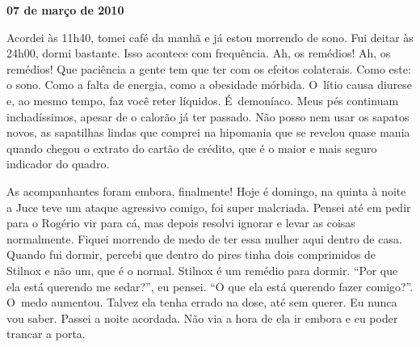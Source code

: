 \begin{center}\textbf{\asterisc{}}\end{center}


\begin{flushright}\textbf{07 de março de 2010}\end{flushright}


Acordei às 11h40, tomei café da manhã e já estou morrendo de sono. Fui
deitar às 24h00, dormi bastante. Isso acontece com frequência. Ah, os
remédios! Ah, os remédios! Que paciência a gente tem que ter com os
efeitos colaterais. Como este: o sono. Como a falta de energia, como a
obesidade mórbida. O~lítio causa diurese e, ao mesmo tempo, faz você
reter líquidos. É~demoníaco. Meus pés continuam inchadíssimos, apesar de
o calorão já ter passado. Não posso nem usar os sapatos novos, as
sapatilhas lindas que comprei na hipomania que se revelou quase mania
quando chegou o extrato do cartão de crédito, que é o maior e mais
seguro indicador do quadro.

As acompanhantes foram embora, finalmente! Hoje é domingo, na quinta à
noite a Juce teve um ataque agressivo comigo, foi super malcriada.
Pensei até em pedir para o Rogério vir para cá, mas depois resolvi
ignorar e levar as coisas normalmente. Fiquei morrendo de medo de
ter essa mulher aqui dentro de casa. Quando fui dormir, percebi que
dentro do pires tinha dois comprimidos de Stilnox e não um, que é o
normal. Stilnox é um remédio para dormir. ``Por que ela está querendo me
sedar?'', eu pensei. ``O que ela está querendo fazer comigo?''. O~medo
aumentou. Talvez ela tenha errado na dose, até sem querer. Eu nunca vou
saber. Passei a noite acordada. Não via a hora de ela ir embora e eu
poder trancar a porta.

